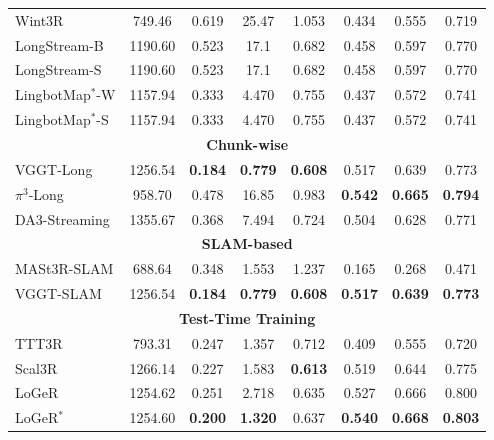 \begin{table}[t]
{\begin{tabular}{l c >{\columncolor{subcol}}c >{\columncolor{subcol}}c >{\columncolor{subcol}}c >{\columncolor{subcol}}c >{\columncolor{subcol}}c >{\columncolor{subcol}}c}
 Wint3R & 749.46 & 0.619 & 25.47 & 1.053 & 0.434 & 0.555 & 0.719 \\
 LongStream-B & 1190.60 & 0.523 & 17.1 & 0.682 & 0.458 & 0.597 & 0.770 \\
 LongStream-S & 1190.60 & 0.523 & 17.1 & 0.682 & 0.458 & 0.597 & 0.770 \\
 LingbotMap$^{*}$-W & 1157.94 & 0.333 & 4.470 & 0.755 & 0.437 & 0.572 & 0.741 \\
 LingbotMap$^{*}$-S & 1157.94 & 0.333 & 4.470 & 0.755 & 0.437 & 0.572 & 0.741 \\
\midrule
\multicolumn{8}{c}{\cellcolor{catgray}\textbf{Chunk-wise}} \\
\midrule
 VGGT-Long & 1256.54 & \cellcolor{secondorange}\textbf{0.184} & \cellcolor{secondorange}\textbf{0.779} & \cellcolor{thirdyellow}\textbf{0.608} & 0.517 & 0.639 & 0.773 \\
 $\pi^{3}$-Long & 958.70 & 0.478 & 16.85 & 0.983 & \textbf{0.542} & \textbf{0.665} & \textbf{0.794} \\
 DA3-Streaming & 1355.67 & 0.368 & 7.494 & 0.724 & 0.504 & 0.628 & 0.771 \\
\midrule
\multicolumn{8}{c}{\cellcolor{catgray}\textbf{SLAM-based}} \\
\midrule
 MASt3R-SLAM & 688.64 & 0.348 & 1.553 & 1.237 & 0.165 & 0.268 & 0.471 \\
 VGGT-SLAM & 1256.54 & \cellcolor{secondorange}\textbf{0.184} & \cellcolor{secondorange}\textbf{0.779} & \cellcolor{thirdyellow}\textbf{0.608} & \textbf{0.517} & \textbf{0.639} & \textbf{0.773} \\
\midrule
\multicolumn{8}{c}{\cellcolor{catgray}\textbf{Test-Time Training}} \\
\midrule
 TTT3R & 793.31 & 0.247 & 1.357 & 0.712 & 0.409 & 0.555 & 0.720 \\
 Scal3R & 1266.14 & 0.227 & 1.583 & \textbf{0.613} & 0.519 & 0.644 & 0.775 \\
 LoGeR & 1254.62 & 0.251 & 2.718 & 0.635 & 0.527 & 0.666 & 0.800 \\
 LoGeR$^*$ & 1254.60 & \textbf{0.200} & \textbf{1.320} & 0.637 & \textbf{0.540} & \textbf{0.668} & \cellcolor{thirdyellow}\textbf{0.803} \\
\bottomrule
\end{tabular}%
}
\end{table}
